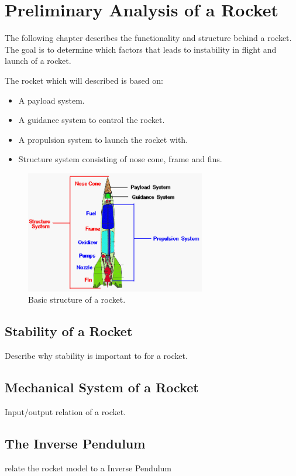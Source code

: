 \chapter{Preliminary Analysis of a Rocket}
The following chapter describes the functionality and structure behind a rocket. The goal is to determine which factors that leads to instability in flight and launch of a rocket. 
\bigbreak

The rocket which will described is based on:
\begin{itemize}[noitemsep]
\item A payload system.
\item A guidance system to control the rocket.
\item A propulsion system to launch the rocket with. 
\item Structure system consisting of nose cone, frame and fins.
\end{itemize}    

\begin{figure}[htbp]
	\centering
 	\includegraphics[width=0.7\textwidth]{figures/RocketStructure.png} 
 	\caption{Basic structure of a rocket.}
 	\label{fig:RocketStructure}
\end{figure}


\section{Stability of a Rocket}
Describe why stability is important to for a rocket. 
\section{Mechanical System of a Rocket}
Input/output relation of a rocket.
\section{The Inverse Pendulum}
relate the rocket model to a Inverse Pendulum